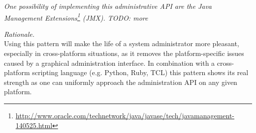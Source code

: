 \textit{One possibility of implementing this administrative API are the Java Management Extensions\footnote{\url{http://www.oracle.com/technetwork/java/javase/tech/javamanagement-140525.html}} (JMX). TODO: more }

\begin{center}
   
\end{center}

\textit{Rationale.}\\
Using this pattern will make the life of a system administrator more pleasant, especially in cross-platform situations, as it removes the platform-specific issues caused by a graphical administration interface. In combination with a cross-platform scripting language (e.g. Python, Ruby, TCL) this pattern shows its real strength as one can uniformly approach the administration API on any given platform.


